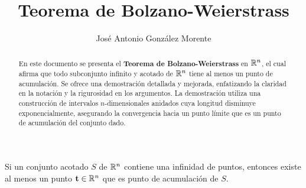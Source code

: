 \documentclass[a4paper,12pt]{article}
\title{Teorema de Bolzano-Weierstrass}
\author{José Antonio González Morente}
\begin{document}
\maketitle

\begin{abstract}
    En este documento se presenta el \textbf{Teorema de Bolzano-Weierstrass} en $\mathbb{R}^n$, el cual afirma que todo subconjunto infinito y acotado de $\mathbb{R}^n$ tiene al menos un punto de acumulación. Se ofrece una demostración detallada y mejorada, enfatizando la claridad en la notación y la rigurosidad en los argumentos. La demostración utiliza una construcción de intervalos $n$-dimensionales anidados cuya longitud disminuye exponencialmente, asegurando la convergencia hacia un punto límite que es un punto de acumulación del conjunto dado.
\end{abstract}

\begin{thm}
Si un conjunto acotado $S$ de $\mathbb{R}^n$ contiene una infinidad de puntos, entonces existe al menos un punto $\mathbf{t} \in \mathbb{R}^n$ que es punto de acumulación de $S$.
\end{thm}
\end{document}
